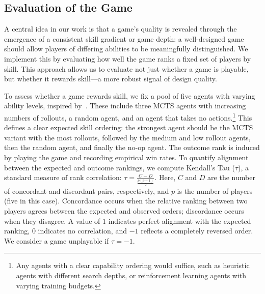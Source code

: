 \documentclass{article} %
\begin{document}

\subsection{Evaluation of the Game}

A central idea in our work is that a game's quality is revealed through the emergence of a consistent skill gradient or game depth: a well-designed game should allow players of differing abilities to be meaningfully distinguished.
We implement this by evaluating how well the game ranks a fixed set of players by skill. This approach allows us to evaluate not just whether a game is playable, but whether it rewards skill---a more robust signal of design quality.

To assess whether a game rewards skill, we fix a pool of five agents with varying ability levels, inspired by~\cite{nielsen2015general}. These include three MCTS agents with increasing numbers of rollouts, a random agent, and an agent that takes no actions.\footnote{Any agents with a clear capability ordering would suffice, such as heuristic agents with different search depths, or reinforcement learning agents with varying training budgets.} This defines a clear expected skill ordering: the strongest agent should be the MCTS variant with the most rollouts, followed by the medium and low rollout agents, then the random agent, and finally the no-op agent.
The outcome rank is induced by playing the game and recording empirical win rates. To quantify alignment between the expected and outcome rankings, we compute Kendall's Tau ($\tau$), a standard measure of rank correlation: $\tau = \frac{C - D}{\frac{p(p - 1)}{2}}$. Here, $C$ and $D$ are the number of concordant and discordant pairs, respectively, and $p$ is the number of players (five in this case). Concordance occurs when the relative ranking between two players agrees between the expected and observed orders; discordance occurs when they disagree. A value of $1$ indicates perfect alignment with the expected ranking, $0$ indicates no correlation, and $-1$ reflects a completely reversed order. We consider a game unplayable if $\tau = -1$.
\end{document}
